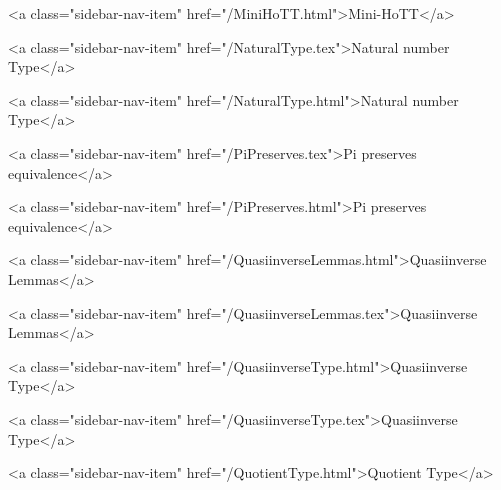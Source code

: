       
    
      
        
          <a class="sidebar-nav-item" href="/MiniHoTT.html">Mini-HoTT</a>
        
      
    
      
        
      
    
      
        
          <a class="sidebar-nav-item" href="/NaturalType.tex">Natural number Type</a>
        
      
    
      
        
          <a class="sidebar-nav-item" href="/NaturalType.html">Natural number Type</a>
        
      
    
      
        
          <a class="sidebar-nav-item" href="/PiPreserves.tex">Pi preserves equivalence</a>
        
      
    
      
        
          <a class="sidebar-nav-item" href="/PiPreserves.html">Pi preserves equivalence</a>
        
      
    
      
        
          <a class="sidebar-nav-item" href="/QuasiinverseLemmas.html">Quasiinverse Lemmas</a>
        
      
    
      
        
          <a class="sidebar-nav-item" href="/QuasiinverseLemmas.tex">Quasiinverse Lemmas</a>
        
      
    
      
        
          <a class="sidebar-nav-item" href="/QuasiinverseType.html">Quasiinverse Type</a>
        
      
    
      
        
          <a class="sidebar-nav-item" href="/QuasiinverseType.tex">Quasiinverse Type</a>
        
      
    
      
        
          <a class="sidebar-nav-item" href="/QuotientType.html">Quotient Type</a>
        
      
    
